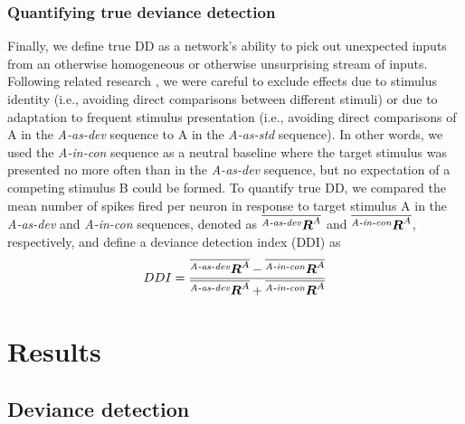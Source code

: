 \documentclass[9pt,lineno,onehalfspacing]{elife}
\newcommand{\dev}{\textit{A-as-dev}}
\newcommand{\msc}{\textit{A-in-con}}
\newcommand{\std}{\textit{A-as-std}}
\newcommand{\ifstringequal}[4]{%
  \ifnum\pdfstrcmp{#1}{#2}=0
  #3%
  \else
  #4%
  \fi
}
\newcommand{\seqreplace}[1]{\ifstringequal{dev}{#1}{\dev}{%
    \ifstringequal{std}{#1}{\std}{%
        \ifstringequal{msc}{#1}{\msc}{#1}%
    }%
}}
\newcommand{\R}[3][]{{}^{\seqreplace{#1}}_{}\boldsymbol R^{#2}_{#3}}
\newcommand{\mean}[1]{\overline{#1}}
\begin{document}
\subsubsection{Quantifying true deviance detection}\label{sec:DDI}
Finally, we define true DD as a network's ability to pick out unexpected inputs from an otherwise homogeneous or otherwise unsurprising stream of inputs. Following related research \citep{Kubota2021-dx,Harms2014-ah,Jacobsen2001-sc}, we were careful to exclude effects due to stimulus identity (i.e., avoiding direct comparisons between different stimuli) or due to adaptation to frequent stimulus presentation (i.e., avoiding direct comparisons of A in the \dev{} sequence to A in the \std{} sequence). In other words, we used the \msc{} sequence as a neutral baseline where the target stimulus was presented no more often than in the \dev{} sequence, but no expectation of a competing stimulus B could be formed. To quantify true DD, we compared the mean number of spikes fired per neuron in response to target stimulus A in the \dev{} and \msc{} sequences, denoted as $\mean{\R[dev]{A}{}}$ and $\mean{\R[msc]{A}{}}$, respectively, and define a deviance detection index (DDI) as
\begin{equation}
    DDI = \frac{\mean{\R[dev]{A}{}} - \mean{\R[msc]{A}{}}}{\mean{\R[dev]{A}{}} + \mean{\R[msc]{A}{}}} \label{eq:ddi}
\end{equation}

\section{Results}\label{sec:results}

\subsection{Deviance detection}\label{sec:dd}
\end{document}

